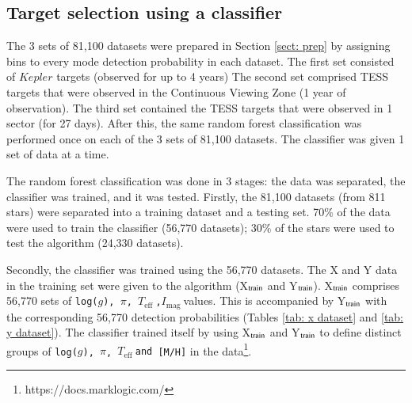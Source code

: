 \documentclass[a4paper,fleqn,usenatbib,useAMS]{mnras}
\newcommand{\teff}{\ensuremath{T_{\textrm{eff}}\:}}
\newcommand{\imag}{\ensuremath{I_{\textrm{mag}}\:}}
\begin{document}
\subsection{Target selection using a classifier}
\label{sect: class-results}

The 3 sets of 81,100 datasets were prepared in Section \ref{sect: prep} by assigning bins to every mode detection probability in each dataset. The first set consisted of $Kepler$ targets (observed for up to 4 years) The second set comprised TESS targets that were observed in the Continuous Viewing Zone (1 year of observation). The third set contained the TESS targets that were observed in 1 sector (for 27 days). After this, the same random forest classification was performed once on each of the 3 sets of 81,100 datasets. The classifier was given 1 set of data at a time.

The random forest classification was done in 3 stages: the data was separated, the classifier was trained, and it was tested. Firstly, the 81,100 datasets (from 811 stars) were separated into a training dataset and a testing set. 70\% of the data were used to train the classifier (56,770 datasets); 30\% of the stars were used to test the algorithm (24,330 datasets).


Secondly, the classifier was trained using the 56,770 datasets. The X and Y data in the training set were given to the algorithm (X$_{\rm train}$ and Y$_{\rm train}$). X$_{\rm train}$ comprises 56,770 sets of \texttt{log($g$), $\pi$, \teff,\:[M/H]\:\imag}values. This is accompanied by Y$_{\rm train}$ with the corresponding 56,770 detection probabilities (Tables \ref{tab: x dataset} and \ref{tab: y dataset}). The classifier trained itself by using X$_{\rm train}$ and Y$_{\rm train}$ to define distinct groups of \texttt{log($g$), $\pi$, \teff{\rm and} [M/H]} in the data\footnote{https://docs.marklogic.com/}.
\end{document}
